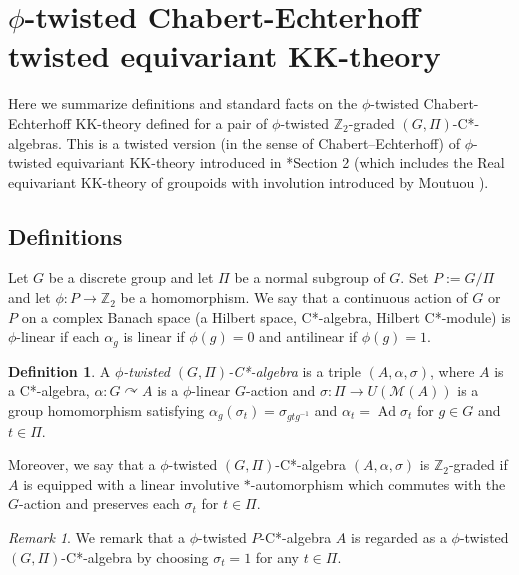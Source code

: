\documentclass[11pt]{amsart}
\theoremstyle{definition}
\newtheorem{defn}[equation]{Definition}
\theoremstyle{plain}
\theoremstyle{remark}
\newtheorem{rmk}[equation]{Remark}
\newcommand{\bZ}{\mathbb{Z}}
\newcommand{\cM}{\mathcal{M}}
\DeclareMathOperator{\Ad}{Ad}
\begin{document}
\section{$\phi$-twisted Chabert-Echterhoff twisted equivariant KK-theory}\label{section:app}
Here we summarize definitions and standard facts on the $\phi$-twisted Chabert-Echterhoff KK-theory \cite{chabertTwistedEquivariantKK2001} defined for a pair of $\phi$-twisted $\bZ_2$-graded $(G,\Pi)$-C*-algebras. This is a twisted version (in the sense of Chabert--Echterhoff) of $\phi$-twisted equivariant KK-theory introduced in \cite{kubotaNotesTwistedEquivariant2016}*{Section 2} (which includes the Real equivariant KK-theory of groupoids with involution introduced by Moutuou \cite{moutuouEquivariantKKTheory2014}). 
\subsection{Definitions}
Let $G$ be a discrete group and let $\Pi$ be a normal subgroup of $G$. Set $P:=G/\Pi$ and let $\phi \colon P \to \bZ_2$ be a homomorphism. 
We say that a continuous action of $G$ or $P$ on a complex Banach space (a Hilbert space, C*-algebra, Hilbert C*-module) is $\phi$-linear if each $\alpha_g$ is linear if $\phi(g)=0$ and antilinear if $\phi(g)=1$.
\begin{defn}\label{def:GCst}
A \emph{$\phi$-twisted $(G,\Pi)$-C*-algebra} is a triple $(A,\alpha, \sigma)$, where $A$ is a C*-algebra, $\alpha \colon G \curvearrowright A$ is a $\phi$-linear $G$-action and $\sigma \colon \Pi \to U(\cM(A))$ is a group homomorphism satisfying $\alpha_g(\sigma_t)=\sigma_{gtg^{-1}}$ and $\alpha_t = \Ad \sigma_t$ for $g \in G$ and $t \in \Pi$. 
\end{defn}
Moreover, we say that a $\phi$-twisted $(G,\Pi)$-C*-algebra $(A,\alpha , \sigma)$ is $\bZ_2$-graded if $A$ is equipped with a linear involutive $\ast$-automorphism which commutes with the $G$-action and preserves each $\sigma_t$ for $t \in \Pi$.

\begin{rmk}\label{rmk:twisted}
We remark that a $\phi$-twisted $P$-C*-algebra $A$ is regarded as a $\phi$-twisted $(G,\Pi)$-C*-algebra by choosing $\sigma _t=1$ for any $t\in \Pi$. 
\end{rmk}
\end{document}
